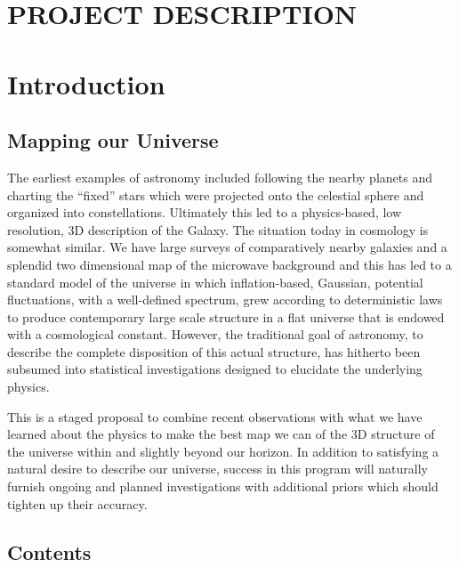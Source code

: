 \documentclass[psfig,11pt]{article}
\begin{document}
\section*{PROJECT DESCRIPTION}


\section{Introduction}

\subsection{Mapping our Universe}

The earliest examples of astronomy included following the nearby planets and charting the ``fixed'' stars which were projected onto the celestial sphere and organized into constellations. Ultimately this led to a physics-based, low resolution,  3D description of the Galaxy. The situation today in cosmology is somewhat similar. We have large surveys of comparatively nearby galaxies and a splendid two dimensional map of the microwave background and this has led to a standard model of the universe in which inflation-based, Gaussian, potential fluctuations, with a well-defined spectrum, grew according to deterministic laws to produce contemporary large scale structure in a flat universe that is endowed with a cosmological constant. However, the traditional goal of astronomy, to describe the complete disposition of this actual structure, has hitherto been subsumed into statistical investigations designed to elucidate the underlying physics.

This is a staged proposal to combine recent observations with what we have learned about the physics to make the best map we can of the 3D structure of the universe within and slightly beyond our horizon. In addition to satisfying a natural desire to describe our universe, success in this program will naturally furnish ongoing and planned investigations with additional priors which should tighten up their accuracy.

\subsection{Contents}
\end{document}
